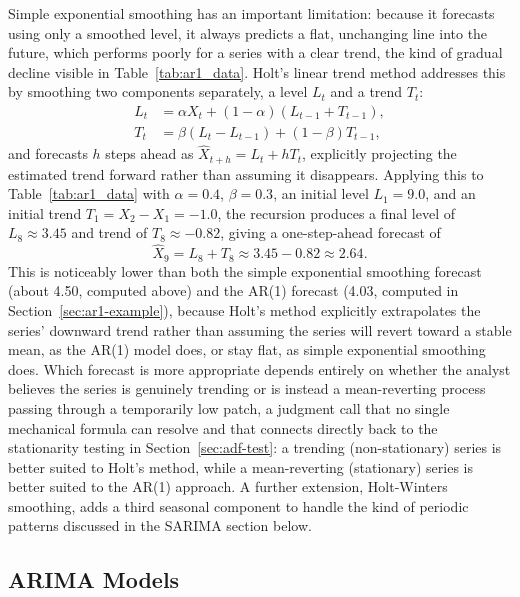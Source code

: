 \documentclass[../ai_in_finance]{subfiles}
\begin{document}
Simple exponential smoothing has an important limitation: because it forecasts using only a smoothed level, it always predicts a flat, unchanging line into the future, which performs poorly for a series with a clear trend, the kind of gradual decline visible in Table~\ref{tab:ar1_data}. Holt's linear trend method addresses this by smoothing two components separately, a level $L_t$ and a trend $T_t$:
\begin{align*}
L_t &= \alpha X_t + (1-\alpha)(L_{t-1} + T_{t-1}), \\
T_t &= \beta (L_t - L_{t-1}) + (1-\beta) T_{t-1},
\end{align*}
and forecasts $h$ steps ahead as $\hat X_{t+h} = L_t + h T_t$, explicitly projecting the estimated trend forward rather than assuming it disappears. Applying this to Table~\ref{tab:ar1_data} with $\alpha=0.4$, $\beta=0.3$, an initial level $L_1=9.0$, and an initial trend $T_1 = X_2 - X_1 = -1.0$, the recursion produces a final level of $L_8 \approx 3.45$ and trend of $T_8 \approx -0.82$, giving a one-step-ahead forecast of
\begin{equation*}
\hat X_9 = L_8 + T_8 \approx 3.45 - 0.82 \approx 2.64.
\end{equation*}
This is noticeably lower than both the simple exponential smoothing forecast (about 4.50, computed above) and the AR(1) forecast (4.03, computed in Section~\ref{sec:ar1-example}), because Holt's method explicitly extrapolates the series' downward trend rather than assuming the series will revert toward a stable mean, as the AR(1) model does, or stay flat, as simple exponential smoothing does.
Which forecast is more appropriate depends entirely on whether the analyst believes the series is genuinely trending or is instead a mean-reverting process passing through a temporarily low patch, a judgment call that no single mechanical formula can resolve and that connects directly back to the stationarity testing in Section~\ref{sec:adf-test}: a trending (non-stationary) series is better suited to Holt's method, while a mean-reverting (stationary) series is better suited to the AR(1) approach. A further extension, Holt-Winters smoothing, adds a third seasonal component to handle the kind of periodic patterns discussed in the SARIMA section below.

\subsection{ARIMA Models}
\end{document}

